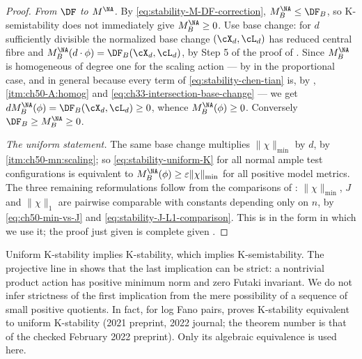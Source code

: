 \begin{proof}
\emph{From $\DF$ to $M^{\NA}$.}  By
\eqref{eq:stability-M-DF-correction}, $M^{\NA}_B\le\DF_B$, so
K-semistability does not immediately give $M^{\NA}_B\ge0$.  Use base
change: for $d$ sufficiently divisible the normalized base change
$(\cX_d,\cL_d)$ has reduced central fibre and
$M^{\NA}_B(d\cdot\phi)=\DF_B(\cX_d,\cL_d)$, by Step 5 of the proof of
.  Since $M^{\NA}_B$ is homogeneous of
degree one for the scaling action --- by
 in the proportional case, and in general
because every term of \eqref{eq:stability-chen-tian} is, by
,
\,\cref{itm:ch50-A:homog} and
\eqref{eq:ch33-intersection-base-change} --- we get
$dM^{\NA}_B(\phi)=\DF_B(\cX_d,\cL_d)\ge0$, whence
$M^{\NA}_B(\phi)\ge0$.  Conversely $\DF_B\ge M^{\NA}_B\ge0$.

\emph{The uniform statement.}  The same base change multiplies
$\|\chi\|_{\min}$ by $d$, by
\,\cref{itm:ch50-mn:scaling}; so
\eqref{eq:stability-uniform-K} for all normal ample test configurations is
equivalent to $M^{\NA}_B(\phi)\ge\varepsilon\|\chi\|_{\min}$ for all
positive model metrics.  The three remaining reformulations follow from the
comparisons of : $\|\chi\|_{\min}$,
$J$ and $\|\chi\|_1$ are pairwise comparable with constants depending
only on $n$, by \eqref{eq:ch50-min-vs-J} and
\eqref{eq:stability-J-L1-comparison}.  This is
\cite[Proposition~8.2]{BHJ17} in the form in which we use it; the proof
just given is complete given .
\end{proof}

\begin{remark}
\label{rem:ch50-k-stable-between}
Uniform K-stability implies K-stability, which implies K-semistability.
The projective line in  shows that
the last implication can be strict: a nontrivial product action has
positive minimum norm and zero Futaki invariant.  We do not infer
strictness of the first implication from the mere possibility of a
sequence of small positive quotients.  In fact, for log Fano pairs,
\cite[Theorem~1.6]{LXZ22} proves K-stability equivalent to uniform
K-stability (2021 preprint, 2022 journal; the theorem number is that
of the checked February 2022 preprint).  Only its algebraic equivalence
is used here.
\end{remark}

